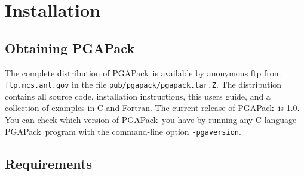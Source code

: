 \documentclass{report}
\newcommand{\pga}{PGAPack}
\begin{document}

\chapter{Installation}\label{chp:install}

\section{Obtaining \pga}\label{sec:obtain}

The complete distribution of \pga\ is available by anonymous ftp from {\tt
ftp.mcs.anl.gov} in the file {\tt pub/pgapack/pgapack.tar.Z}. The distribution
contains all source code, installation instructions, this users guide, and a
collection of examples in C and Fortran.  The current release of \pga\ is 1.0.
You can check which version of \pga\ you have by running any C language \pga\
program with the command-line option {\tt -pgaversion}.


\section{Requirements}\label{sec:require}
\end{document}
